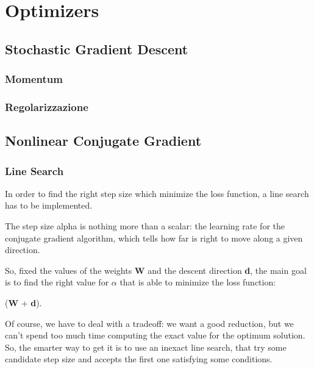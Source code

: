 \chapter{Optimizers} %
\label{cha:optimizers}
	\section{Stochastic Gradient Descent} %
	\label{sec:sgd}
	

		\subsection{Momentum} %
		\label{sec:momentum}
		

		\subsection{Regolarizzazione} %
		\label{sec:regolarizzazione}

	\section{Nonlinear Conjugate Gradient} %
	\label{sec:nonlinear_conjugate_gradient}

		\subsection{Line Search} %
		\label{sub:line_search}

			In order to find the right step size which minimize the loss function, a line search has to be implemented.

			The step size alpha is nothing more than a scalar: the learning rate for the conjugate gradient algorithm, which tells how far is right to move along a given direction. 

			So, fixed the values of the weights \textbf{W} and the descent direction \textbf{d}, the main goal is to find the right value for $\alpha$ that is able to minimize the loss function:

			 \begin{mini} 
			   {\alpha}{(\textbf{W} + \alpha\textbf{d}).}{}{}
			    \end{mini}

			Of course, we have to deal with a tradeoff: we want a good reduction, but we can't spend too much time computing the exact value for the optimum solution. So, the smarter way to get it is to use an inexact line search, that try some candidate step size and accepts the first one satisfying some conditions.  

